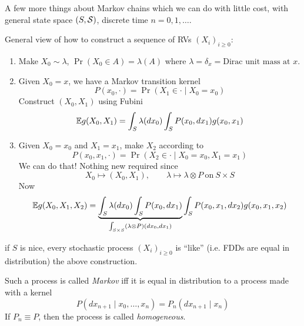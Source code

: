 
A few more things about Markov chains which we can do with little cost,
with general state space $(S, \mathcal{S})$, discrete time $n = 0, 1, \ldots$.

General view of how to construct a sequence of RVs $(X_i)_{i \geq 0}$:
\begin{enumerate}
  \item Make $X_0 \sim \lambda$, $\Pr(X_0 \in A) = \lambda(A)$
    where $\lambda = \delta_x = \text{Dirac unit mass at $x$}$.
  \item Given $X_0 = x$, we have a Markov transition kernel
    \[
      P(x_0, \cdot) = \Pr(X_1 \in \cdot \mid X_0 = x_0)
    \]
    Construct $(X_0, X_1)$ using Fubini
    \[
      \mathbb{E} g(X_0, X_1)
      = \int_S \lambda (dx_0) \int_S P(x_0, dx_1) g(x_0, x_1)
    \]
  \item Given $X_0 = x_0$ and $X_1 = x_1$, make $X_2$ according to
    \[
      P(x_0, x_1, \cdot) = \Pr(X_2 \in \cdot \mid X_0 = x_0, X_1 = x_1)
    \]
    We can do that! Nothing new required since
    \[
      X_0 \mapsto (X_0, X_1), \qquad \lambda \mapsto \lambda \otimes P~\text{on}~S \times S
    \]
    Now
    \[
      \mathbb{E} g(X_0, X_1, X_2) = \underbrace{\int_S \lambda(dx_0) \int_S P(x_0, dx_1)}_{\int_{S \times S} (\lambda \otimes P)(dx_0, dx_1)}
      \int_S P(x_0, x_1, dx_2) g(x_0, x_1, x_2)
    \]
\end{enumerate}
if $S$ is nice, every stochastic process $(X_i)_{i \geq 0}$ is
``like'' (i.e. FDDs are equal in distribution) the above construction.

\begin{definition}
  Such a process is called \emph{Markov} iff it is equal in distribution
  to a process made with a kernel
  \[
    P(dx_{n+1} \mid x_0, \ldots, x_n)
    = P_n(dx_{n+1} \mid x_n)
  \]
  If $P_n \equiv P$, then the process is called \emph{homogeneous}.
\end{definition}


